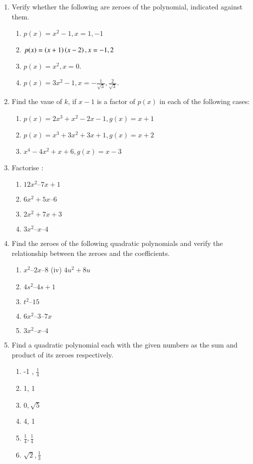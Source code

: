 \renewcommand{\theequation}{\theenumi}
\begin{enumerate}[label=\arabic*.,ref=\thesubsection.\theenumi]
\item Verify whether the following are zeroes of the polynomial, indicated against them. 
\begin{enumerate}

\item $ p(x) = x^2-1, x = 1, -1$
\item $ p(x) = \left(x+1\right) \left(x-2\right), x = -1,2$
\item $ p(x) = x^2, x = 0$.
\item $ p(x) = 3x^2-1, x = -\frac{1}{\sqrt{3}}, \frac{2}{\sqrt{3}}$.
\end{enumerate}
\item Find the vaue of $k$, if $x-1$ is a factor of $p(x)$ in each of the following cases:
\begin{enumerate}
\item $p(x) = 2x^3+x^2-2x-1, g(x) = x+1$
\item $p(x) = x^3+3x^2+3x+1, g(x) = x+2$
\item $x^4-4x^2+x+6, g(x) = x-3$
\end{enumerate}
%
\item  Factorise : 
\begin{enumerate}
\item $12x^2 – 7x + 1 $
\item $6x^2+ 5x – 6$
\item $2x^2+ 7x + 3 $
\item $3x^2– x – 4$
\end{enumerate}
\item Find the zeroes of the following quadratic polynomials and verify the relationship between the zeroes and the coefficients.
\begin{enumerate}
\item $x^2 – 2x – 8$
(iv) $4u^2 + 8u$
\item $4s^2 – 4s + 1$
\item $t^2 – 15$
\item $6x^2– 3 – 7x $
\item $3x^2 – x – 4$
\end{enumerate}
\item  Find a quadratic polynomial each with the given numbers as the sum and product of its zeroes respectively.
\begin{enumerate}
\item-1 , $\frac{1}{ 4}$
\item 1, 1
\item $0, \sqrt{5}$ 
\item 4, 1
 \item $\frac{1}{4}, \frac{1}{4}$
\item  $\sqrt{2}, \frac{1}{ 3}$
\end{enumerate}
\end{enumerate}
